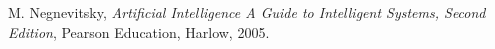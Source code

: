 
\begin{thebibliography}{99}

	 M. Negnevitsky, \emph{Artificial Intelligence A Guide to Intelligent Systems, Second Edition}, Pearson Education, Harlow, 2005.


	
	

		
\end{thebibliography}
